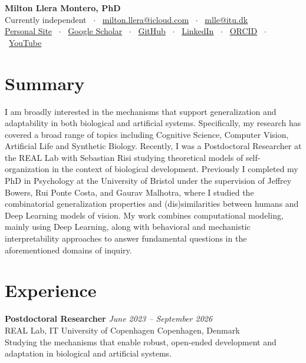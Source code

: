 \documentclass[10pt,a4paper]{article}
\begin{document}
\begin{center}
    {\LARGE \textbf{\color{primary} Milton Llera Montero, PhD}} \\[0.35em]
    Currently independent \ $\cdot$ \
    \href{mailto:milton.llera@icloud.com}{milton.llera@icloud.com} \ $\cdot$ \
    \href{mailto:mlle@itu.dk}{mlle@itu.dk} \\[0.25em]
    \href{mlmontero.com}{Personal Site} \ $\cdot$ \
    \href{https://scholar.google.com/citations?user=mTcxP70AAAAJ&hl=en}{Google Scholar} \ $\cdot$ \
    \href{https://www.github.com/miltonllera}{GitHub} \ $\cdot$ \
    \href{https://www.linkedin.com/in/milton-l-montero/}{LinkedIn} \ $\cdot$ \
    \href{https://orcid.org/0000-0002-7440-3510}{ORCID} \ $\cdot$ \
    \href{https://www.youtube.com/@miltonllera1437/featured}{YouTube}
\end{center}

\vspace{-0.2em}

\section*{Summary}
I am broadly interested in the mechanisms that support generalization and adaptability in both biological and artificial systems. Specifically, my research has covered a broad range of topics including Cognitive Science, Computer Vision, Artificial Life and Synthetic Biology. Recently, I was a Postdoctoral Researcher at the REAL Lab with Sebastian Risi studying theoretical models of self-organization in the context of biological development. Previously I completed my PhD in Psychology at the University of Bristol under the supervision of Jeffrey Bowers, Rui Ponte Costa, and Gaurav Malhotra, where I studied the combinatorial generalization properties and (dis)similarities between humans and Deep Learning models of vision. My work combines computational modeling, mainly using Deep Learning, along with behavioral and mechanistic interpretability approaches to answer fundamental questions in the aforementioned domains of inquiry.

\section*{Experience}

\textbf{Postdoctoral Researcher} \hfill \textit{June 2023 -- September 2026} \\
REAL Lab, IT University of Copenhagen \hfill Copenhagen, Denmark \\
Studying the mechanisms that enable robust, open-ended development and adaptation in biological and artificial systems.
\end{document}
